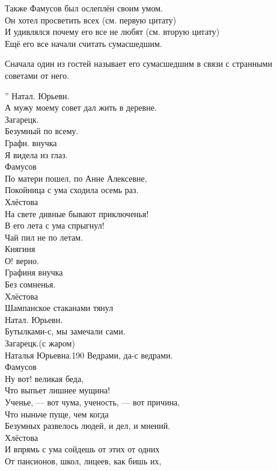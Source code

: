 \documentclass[12pt,a4paper]{article}
\begin{document}
Также Фамусов был ослеплён своим умом.	\\
Он хотел просветить всех (см. первую цитату)\\
И удивлялся почему его все не любят (см. вторую цитату)\\

Ещё его все начали считать сумасшедшим. 

Сначала один из гостей называет его сумасшедшим в связи с странными советами от него.

''
Натал. Юрьевн.\\
А мужу моему совет дал жить в деревне.\\
Загарецк.\\
Безумный по всему.\\
Графн. внучка\\
Я видела из глаз.\\
Фамусов\\
По матери пошел, по Анне Алексевне,\\
Покойница с ума сходила осемь раз.\\
Хлёстова\\
На свете дивные бывают приключенья!\\
В его лета с ума спрыгнул!\\
Чай пил не по летам.\\
Княгиня\\
О! верно.\\
Графиня внучка\\
Без сомненья.\\
Хлёстова\\
Шампанское стаканами тянул\\
Натал. Юрьевн.\\
Бутылками-с, мы замечали сами.\\
Загарецк.(с жаром)\\
Наталья Юрьевна.190 Ведрами, да-с ведрами.\\
Фамусов\\
Ну вот! великая беда,\\
Что выпьет лишнее мущина!\\
Ученье, — вот чума, ученость, — вот причина,\\
Что ныньче пуще, чем когда\\
Безумных развелось людей, и дел, и мнений.\\
Хлёстова\\
И впрямь с ума сойдешь от этих от одних\\
От пансионов, школ, лицеев, как бишь их,\\
\end{document}
